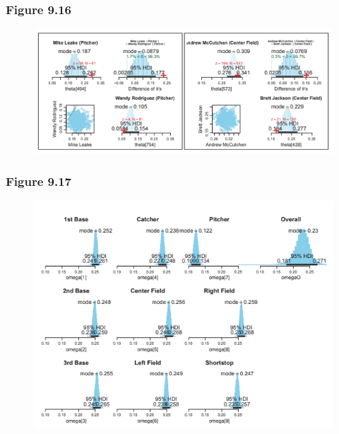 \documentclass[usenames,dvipsnames,table]{beamer}
\begin{document}
\begin{frame}
\frametitle{Figure 9.16}
\begin{figure}
\centering
\includegraphics[width=\linewidth]{img/fig9_16}
\end{figure}
\end{frame}

\begin{frame}
\frametitle{Figure 9.17}
\begin{figure}
\centering
\includegraphics[height=0.8\textheight]{img/fig9_17}
\end{figure}
\end{frame}
\end{document}
